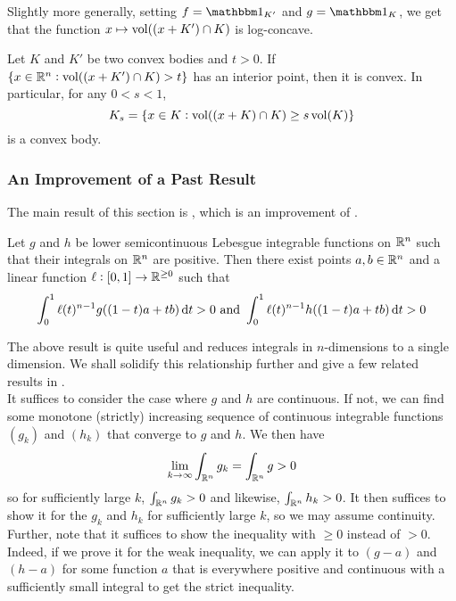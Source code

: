 Slightly more generally, setting $f=\indic_{K'}$ and $g=\indic_K$, we get that the function $x\mapsto \operatorname{vol}((x+K')\cap K)$ is log-concave.

\begin{corollary}
	Let $K$ and $K'$ be two convex bodies and $t>0$. If $\{x\in\mathbb{R}^n:\operatorname{vol}((x+K')\cap K)>t\}$ has an interior point, then it is convex. In particular, for any $0<s<1$,
	\[ K_s = \{x\in K : \operatorname{vol}((x+K)\cap K) \geq s\operatorname{vol}(K)\} \]
	is a convex body.
\end{corollary}

\subsubsection{An Improvement of a Past Result}

The main result of this section is , which is an improvement of .

\begin{ftheo}
\label{localization lemma}
	Let $g$ and $h$ be lower semicontinuous Lebesgue integrable functions on $\mathbb{R}^n$ such that their integrals on $\mathbb{R}^n$ are positive. Then there exist points $a,b\in\mathbb{R}^n$ and a linear function $\ell:[0,1]\to\mathbb{R}^{\geq 0}$ such that
	\[ \int_0^1 \ell(t)^{n-1}g((1-t)a+tb)\operatorname{d}\!{t} > 0 \text{ and } \int_0^1 \ell(t)^{n-1}h((1-t)a+tb)\operatorname{d}\!{t} > 0 \]
\end{ftheo}

The above result is quite useful and reduces integrals in $n$-dimensions to a single dimension. We shall solidify this relationship further and give a few related results in . \\

It suffices to consider the case where $g$ and $h$ are continuous. If not, we can find some monotone (strictly) increasing sequence of continuous integrable functions $(g_k)$ and $(h_k)$ that converge to $g$ and $h$. We then have
\[ \lim_{k\to\infty}\int_{\mathbb{R}^n} g_k = \int_{\mathbb{R}^n} g > 0 \]
so for sufficiently large $k$, $\int_{\mathbb{R}^n} g_k > 0$ and likewise, $\int_{\mathbb{R}^n} h_k > 0$. It then suffices to show it for the $g_k$ and $h_k$ for sufficiently large $k$, so we may assume continuity.\\
Further, note that it suffices to show the inequality with $\geq 0$ instead of $>0$. Indeed, if we prove it for the weak inequality, we can apply it to $(g-a)$ and $(h-a)$ for some function $a$ that is everywhere positive and continuous with a sufficiently small integral to get the strict inequality.\\

